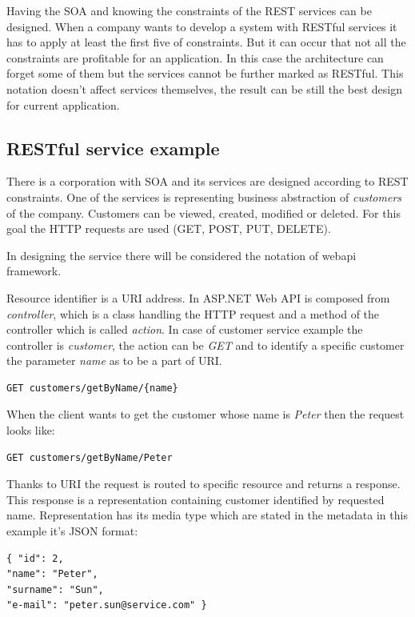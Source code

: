 Having the SOA and knowing the constraints of the REST services can be designed. When a company wants to develop a system with RESTful services it has to apply at least the first five of constraints. But it can occur that not all the constraints are profitable for an application. In this case the architecture can forget some of them but the services cannot be further marked as RESTful. This notation doesn't affect services themselves, the result can be still the best design for current application.

\subsection{RESTful service example}
There is a corporation with SOA and its services are designed according to REST constraints. One of the services is representing business abstraction of \emph{customers} of the company. Customers can be viewed, created, modified or deleted. For this goal the HTTP requests are used (GET, POST, PUT, DELETE). 

In designing the service there will be considered the notation of \gls{webapi} \gls{framework}. 

Resource identifier is a URI address. In ASP.NET Web API is composed from \emph{controller}, which is a class handling the HTTP request and a method of the controller which is called \emph{action}. In case of customer service example the controller is \emph{customer}, the action can be \emph{GET} and to identify a specific customer the parameter \emph{name} as to be a part of URI.


\begin{lstlisting}
GET customers/getByName/{name} 
\end{lstlisting}

When the client wants to get the customer whose name is \emph{Peter} then the request looks like:

\begin{lstlisting}
GET customers/getByName/Peter 
\end{lstlisting}

Thanks to URI the request is routed to specific resource and returns a response. This response is a representation containing customer identified by requested name. Representation has its media type which are stated in the metadata in this  example it's JSON format:

\begin{lstlisting}
{ "id": 2,
"name": "Peter",
"surname": "Sun",
"e-mail": "peter.sun@service.com" }
\end{lstlisting}



